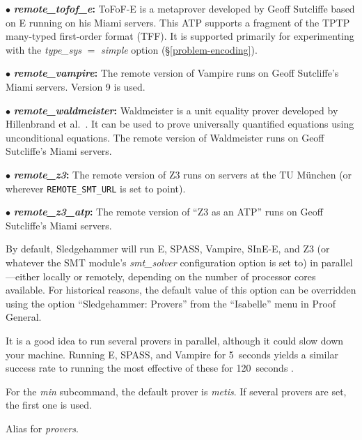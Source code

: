 \documentclass[a4paper,12pt]{article}
\begin{document}
\begin{enum}
\begin{enum}
\item[$\bullet$] \textbf{\textit{remote\_tofof\_e}:} ToFoF-E is a metaprover
developed by Geoff Sutcliffe \cite{tofof} based on E running on his Miami
servers. This ATP supports a fragment of the TPTP many-typed first-order format
(TFF). It is supported primarily for experimenting with the
\textit{type\_sys} $=$ \textit{simple} option (\S\ref{problem-encoding}).

\item[$\bullet$] \textbf{\textit{remote\_vampire}:} The remote version of
Vampire runs on Geoff Sutcliffe's Miami servers. Version 9 is used.

\item[$\bullet$] \textbf{\textit{remote\_waldmeister}:} Waldmeister is a unit
equality prover developed by Hillenbrand et al.\ \cite{waldmeister}. It can be
used to prove universally quantified equations using unconditional equations.
The remote version of Waldmeister runs on Geoff Sutcliffe's Miami servers.

\item[$\bullet$] \textbf{\textit{remote\_z3}:} The remote version of Z3 runs on
servers at the TU M\"unchen (or wherever \texttt{REMOTE\_SMT\_URL} is set to
point).

\item[$\bullet$] \textbf{\textit{remote\_z3\_atp}:} The remote version of ``Z3
as an ATP'' runs on Geoff Sutcliffe's Miami servers.
\end{enum}

By default, Sledgehammer will run E, SPASS, Vampire, SInE-E, and Z3 (or whatever
the SMT module's \textit{smt\_solver} configuration option is set to) in
parallel---either locally or remotely, depending on the number of processor
cores available. For historical reasons, the default value of this option can be
overridden using the option ``Sledgehammer: Provers'' from the ``Isabelle'' menu
in Proof General.

It is a good idea to run several provers in parallel, although it could slow
down your machine. Running E, SPASS, and Vampire for 5~seconds yields a similar
success rate to running the most effective of these for 120~seconds
\cite{boehme-nipkow-2010}.

For the \textit{min} subcommand, the default prover is \textit{metis}. If
several provers are set, the first one is used.

Alias for \textit{provers}.



\end{enum}
\end{document}
